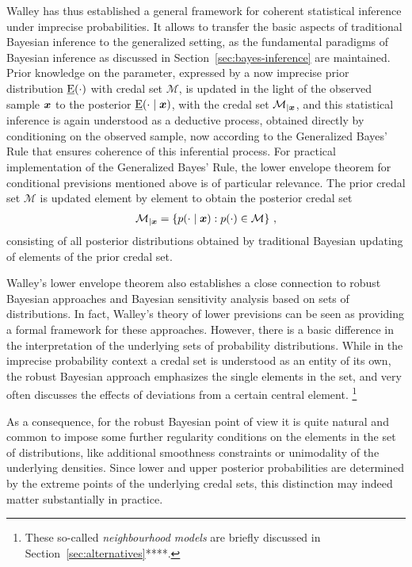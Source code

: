 Walley has thus established a general framework for coherent statistical inference under imprecise probabilities.
It allows to transfer the basic aspects of traditional Bayesian inference to the generalized setting,
as the fundamental paradigms of Bayesian inference as discussed in Section~\ref{sec:bayes-inference} are maintained.
Prior knowledge on the parameter, expressed by a now imprecise prior distribution $\underline{\operatorname{E}}(\cdot)$ with credal set $\mathcal{M}$,
is updated in the light of the observed sample ${\bm x}$ to the posterior $\underline{\operatorname{E}}(\cdot \mid {\bm x})$,
with the credal set $\mathcal{M}_{\vert {\bm x}}$,
and this statistical inference is again understood as a deductive process,
obtained directly by conditioning on the observed sample,
now according to the Generalized Bayes' Rule that ensures coherence of this inferential process.
For practical implementation of the Generalized Bayes' Rule, the lower envelope theorem for conditional 
previsions mentioned above %
is of particular relevance.
The prior credal set $\mathcal{M}$ is updated element by element to obtain the posterior credal set %
\begin{align}
\label{eq:posteriorcredalset}
\mathcal{M}_{\vert {\bm x}} = \left\{ p(\cdot \mid {\bm x}) :  p(\cdot) \in \mathcal{M} \right\}\,,
\end{align}
consisting of all posterior distributions obtained
by traditional Bayesian updating of elements of the prior credal set.

Walley's lower envelope theorem also establishes a close connection to robust Bayesian approaches and Bayesian sensitivity analysis
\parencite[see, e.g.,][]{1994:berger, 2000:rios, 2005:ruggeri} based on sets of distributions.
In fact, Walley's theory of lower previsions can be seen as
providing a formal framework for these approaches.
However, there is a basic difference in the interpretation of the underlying sets of probability distributions.
While in the imprecise probability context a credal set is understood as an entity of its own,
the robust Bayesian approach emphasizes the single elements in the set,
and very often discusses the effects of deviations from a certain central element.%
\footnote{These so-called \emph{neighbourhood models} are briefly discussed in Section~\ref{sec:alternatives}****.}

As a consequence, for the robust Bayesian point of view it is quite natural and common
to impose some further regularity conditions on the elements in the set of distributions,
like additional smoothness constraints or unimodality of the underlying densities.
Since lower and upper posterior probabilities are determined by the extreme points of the underlying credal sets,
this distinction may indeed matter substantially in practice.


